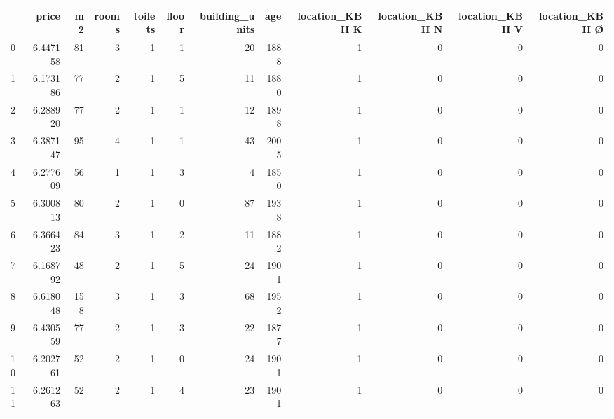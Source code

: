 \begin{tabular}{lrrrrrrrrrrr}
\toprule
{} &     price &   m2 &  rooms &  toilets &  floor &  building\_units &   age &  location\_KBH K &  location\_KBH N &  location\_KBH V &  location\_KBH Ø \\
\midrule
0   &  6.447158 &   81 &      3 &        1 &      1 &              20 &  1888 &               1 &               0 &               0 &               0 \\
1   &  6.173186 &   77 &      2 &        1 &      5 &              11 &  1880 &               1 &               0 &               0 &               0 \\
2   &  6.288920 &   77 &      2 &        1 &      1 &              12 &  1898 &               1 &               0 &               0 &               0 \\
3   &  6.387147 &   95 &      4 &        1 &      1 &              43 &  2005 &               1 &               0 &               0 &               0 \\
4   &  6.277609 &   56 &      1 &        1 &      3 &               4 &  1850 &               1 &               0 &               0 &               0 \\
5   &  6.300813 &   80 &      2 &        1 &      0 &              87 &  1938 &               1 &               0 &               0 &               0 \\
6   &  6.366423 &   84 &      3 &        1 &      2 &              11 &  1882 &               1 &               0 &               0 &               0 \\
7   &  6.168792 &   48 &      2 &        1 &      5 &              24 &  1901 &               1 &               0 &               0 &               0 \\
8   &  6.618048 &  158 &      3 &        1 &      3 &              68 &  1952 &               1 &               0 &               0 &               0 \\
9   &  6.430559 &   77 &      2 &        1 &      3 &              22 &  1877 &               1 &               0 &               0 &               0 \\
10  &  6.202761 &   52 &      2 &        1 &      0 &              24 &  1901 &               1 &               0 &               0 &               0 \\
11  &  6.261263 &   52 &      2 &        1 &      4 &              23 &  1901 &               1 &               0 &               0 &               0 \\

\end{tabular}
